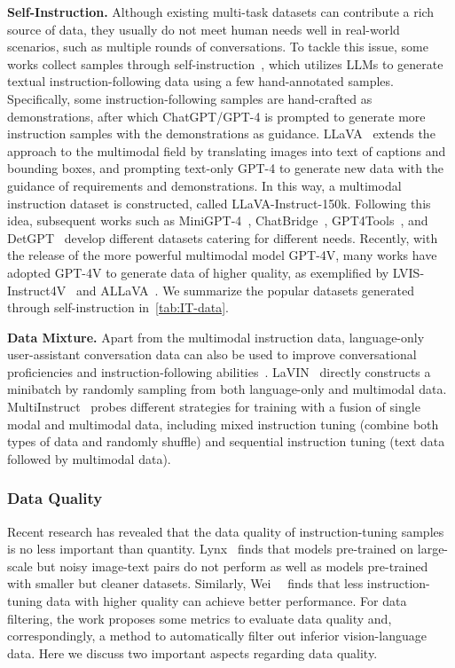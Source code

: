 \noindent \textbf{Self-Instruction.}
Although existing multi-task datasets can contribute a rich source of data, they usually do not meet human needs well in real-world scenarios, such as multiple rounds of conversations.
To tackle this issue, some works collect samples through self-instruction~\cite{wang2022self}, which utilizes LLMs to generate textual instruction-following data using a few hand-annotated samples. Specifically, some instruction-following samples are hand-crafted as demonstrations, after which ChatGPT/GPT-4 is prompted to generate more instruction samples with the demonstrations as guidance. LLaVA~\cite{llava} extends the approach to the multimodal field by translating images into text of captions and bounding boxes, and prompting text-only GPT-4 to generate new data with the guidance of requirements and demonstrations. 
In this way, a multimodal instruction dataset is constructed, called LLaVA-Instruct-150k. Following this idea, subsequent works such as MiniGPT-4~\cite{minigpt-4}, ChatBridge~\cite{chatbridge}, GPT4Tools~\cite{gpt4tools}, and DetGPT~\cite{detgpt} develop different datasets catering for different needs.
Recently, with the release of the more powerful multimodal model GPT-4V, many works have adopted GPT-4V to generate data of higher quality, as exemplified by LVIS-Instruct4V~\cite{wang2023see} and ALLaVA~\cite{chen2024allava}. We summarize the popular datasets generated through self-instruction in~\cref{tab:IT-data}.


\noindent \textbf{Data Mixture.}
Apart from the multimodal instruction data, language-only user-assistant conversation data can also be used to improve conversational proficiencies and instruction-following abilities~\cite{llama-adapter-v2, mplug-owl, multimodal-gpt, lavin}. 
LaVIN~\cite{lavin} directly constructs a minibatch by randomly sampling from both language-only and multimodal data. 
MultiInstruct~\cite{multiinstruct} probes different strategies for training with a fusion of single modal and multimodal data, including mixed instruction tuning (combine both types of data and randomly shuffle) and sequential instruction tuning (text data followed by multimodal data).


\subsubsection{Data Quality}
Recent research has revealed that the data quality of instruction-tuning samples is no less important than quantity.
Lynx~\cite{zeng2023matters} finds that models pre-trained on large-scale but noisy image-text pairs do not perform as well as models pre-trained with smaller but cleaner datasets.
Similarly, Wei~\etal~\cite{wei2023instructiongpt} finds that less instruction-tuning data with higher quality can achieve better performance. For data filtering, the work proposes some metrics to evaluate data quality and, correspondingly, a method to automatically filter out inferior vision-language data.
Here we discuss two important aspects regarding data quality.  

